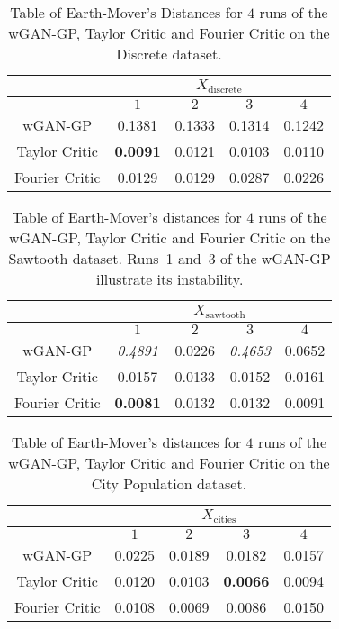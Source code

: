 \documentclass[letterpaper]{article} %
\begin{document}
\begin{table}[!htb]
\centering
\begin{tabular}{||c||c|c|c|c||}
\hline
& \multicolumn{4}{c||}{$X_\text{discrete}$} \\
\hline
 & $1$ & $2$ & $3$ & $4$ \\ [0.5ex]
 \hline\hline
 wGAN-GP & 0.1381 & 0.1333 & 0.1314 & 0.1242 \\
 \hline
 Taylor Critic & \textbf{0.0091} & 0.0121 & 0.0103 & 0.0110 \\
 \hline
 Fourier Critic & 0.0129 & 0.0129 & 0.0287 & 0.0226 \\
 \hline
\end{tabular}
    \caption{Table of Earth-Mover's Distances for $4$ runs of the wGAN-GP, Taylor Critic and Fourier Critic on the Discrete dataset.}\label{tab:disc_runs}
\end{table}

\begin{table}[!htb]
\centering
\begin{tabular}{||c||c|c|c|c||}
\hline
& \multicolumn{4}{c||}{$X_\text{sawtooth}$} \\
\hline
 & $1$ & $2$ & $3$ & $4$ \\ [0.5ex]
 \hline\hline
 wGAN-GP & \emph{0.4891} & 0.0226 & \emph{0.4653} & 0.0652 \\
 \hline
 Taylor Critic & 0.0157 & 0.0133 & 0.0152 & 0.0161 \\
 \hline
 Fourier Critic & \textbf{0.0081} & 0.0132 & 0.0132 & 0.0091 \\
 \hline
\end{tabular}
    \caption{Table of Earth-Mover's distances for $4$ runs of the wGAN-GP, Taylor Critic and Fourier Critic on the Sawtooth dataset.  Runs~1 and~3 of the wGAN-GP illustrate its instability.}\label{tab:sawtooth_runs}
\end{table}

\begin{table}[!htb]
\centering
\begin{tabular}{||c||c|c|c|c||}
\hline
& \multicolumn{4}{c||}{$X_\text{cities}$} \\
\hline
 & $1$ & $2$ & $3$ & $4$ \\ [0.5ex]
 \hline\hline
 wGAN-GP & 0.0225 & 0.0189 & 0.0182 & 0.0157 \\
 \hline
 Taylor Critic & 0.0120 & 0.0103 & \textbf{0.0066} & 0.0094 \\
 \hline
 Fourier Critic & 0.0108 & 0.0069 & 0.0086 & 0.0150 \\
 \hline
\end{tabular}
    \caption{Table of Earth-Mover's distances for $4$ runs of the wGAN-GP, Taylor Critic and Fourier Critic on the City Population dataset.}\label{tab:cities_runs}
\end{table}
\end{document}
